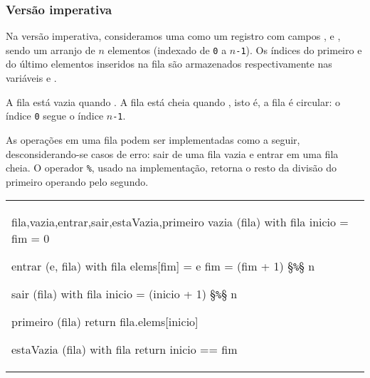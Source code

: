 
\subsubsection{Versão imperativa}
\label{sec:fila-imperativa}

Na versão imperativa, consideramos uma  como um registro com
campos ,  e , sendo  um
arranjo de $n$ elementos (indexado de {\tt 0} a {\tt $n$-1}).  Os
índices do primeiro e do último elementos inseridos na fila são
armazenados respectivamente nas variáveis  e .

A fila está vazia quando . A fila está cheia
quando , isto é, a fila é circular: o
índice {\tt 0} segue o índice {\tt $n$-1}. 

As operações em uma fila podem ser implementadas como a seguir,
desconsiderando-se casos de erro: sair de uma fila vazia e entrar em uma
fila cheia. O operador {\tt \%}, usado na implementação, retorna o resto da
divisão do primeiro operando pelo segundo.

\begin{center}
\begin{tabular}{l}
\begin{alg}{fila,vazia,entrar,sair,estaVazia,primeiro}{}
vazia (fila) { with fila { inicio = fim = 0 } } 
 
entrar (e, fila)
   with fila
      elems[fim] = e
      fim = (fim + 1) §{\tt \%}§ n
      
sair (fila) { with fila { inicio = (inicio + 1) §{\tt \%}§ n } }
   
primeiro (fila) { return fila.elems[inicio] }

estaVazia (fila) { with fila { return inicio == fim } } 
\end{alg}
\end{tabular}
\end{center} 


